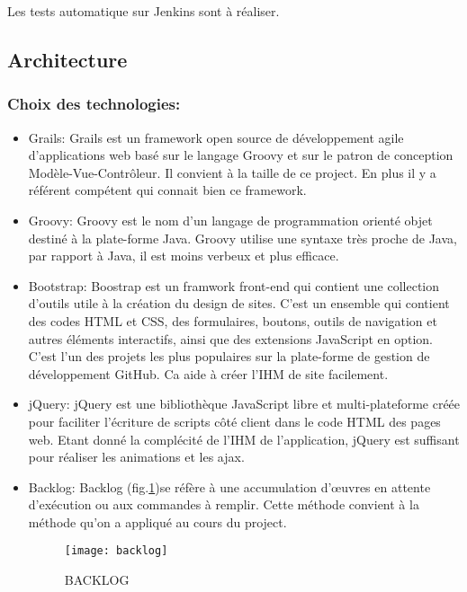 Les tests automatique sur Jenkins sont à réaliser.

\clearpage

\subsection{Architecture}
\subsubsection*{Choix des technologies:}
\begin{itemize}
 \item Grails:
       Grails est un framework open source de développement agile d'applications web basé sur le langage Groovy et sur le patron de conception Modèle-Vue-Contrôleur.
       Il convient à la taille de ce project. En plus il y a référent compétent qui connait bien ce framework.
 \item Groovy:
       Groovy est le nom d'un langage de programmation orienté objet destiné à la plate-forme Java.
       Groovy utilise une syntaxe très proche de Java, par rapport à Java, il est moins verbeux et plus efficace.
 \item Bootstrap:
       Boostrap est un framwork front-end qui contient  une collection d'outils utile à la création du design de sites. C'est un ensemble qui contient des codes HTML et CSS, des formulaires, boutons, outils de navigation et autres éléments interactifs, ainsi que des extensions JavaScript en option. C'est l'un des projets les plus populaires sur la plate-forme de gestion de développement GitHub.
       Ca aide à créer l'IHM de site facilement.
 \item jQuery:
       jQuery est une bibliothèque JavaScript libre et multi-plateforme créée pour faciliter l'écriture de scripts côté client dans le code HTML des pages web.
       Etant donné la complécité de l'IHM de l'application, jQuery est suffisant pour réaliser les animations et les ajax.
 \item Backlog:
       Backlog (fig.\ref{fig:backlog})se réfère à une accumulation d'œuvres en attente d'exécution ou aux commandes à remplir.
       Cette méthode convient à la méthode qu'on a appliqué au cours du project.

       \begin{figure}[ht]
        \centering
        \texttt{[image: backlog]}
        \caption{BACKLOG}
        \label{fig:backlog}
       \end{figure}

\end{itemize}


